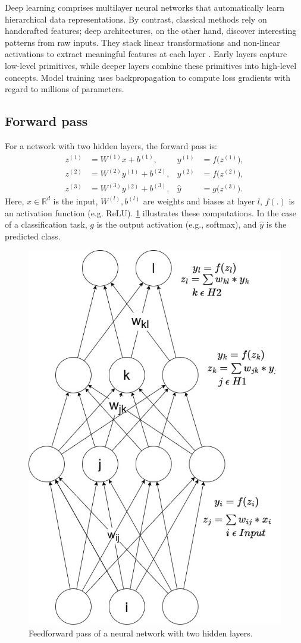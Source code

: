 Deep learning comprises multilayer neural networks that automatically learn hierarchical data representations. By contrast, classical methods rely on handcrafted features; deep architectures, on the other hand, discover interesting patterns from raw inputs. They stack linear transformations and non-linear activations to extract meaningful features at each layer \cite{lecun_deep_learning_2015}. Early layers capture low-level primitives, while deeper layers combine these primitives into high-level concepts. Model training uses backpropagation to compute loss gradients with regard to millions of parameters. 

\subsection{Forward pass}
For a network with two hidden layers, the forward pass is:
\begin{align}
z^{(1)} &= W^{(1)} x + b^{(1)}, & y^{(1)} &= f\bigl(z^{(1)}\bigr), \\
z^{(2)} &= W^{(2)} y^{(1)} + b^{(2)}, & y^{(2)} &= f\bigl(z^{(2)}\bigr), \\
z^{(3)} &= W^{(3)} y^{(2)} + b^{(3)}, & \hat{y} &= g\bigl(z^{(3)}\bigr).
\end{align}
Here, \(x\in\mathbb{R}^d\) is the input, \(W^{(l)},b^{(l)}\) are weights and biases at layer \(l\), \(f(.)\) is an activation function (e.g. ReLU). \cref{fig:forward_pass} illustrates these computations. In the case of a classification task, \(g\) is the output activation (e.g., softmax), and \(\hat{y}\) is the predicted class.

\begin{figure}[ht]
    \centering 
    \includegraphics[width=0.6\linewidth]{figures/neural_net.jpg}
    \caption{Feedforward pass of a neural network with two hidden layers.} 
    \label{fig:forward_pass}
\end{figure}

